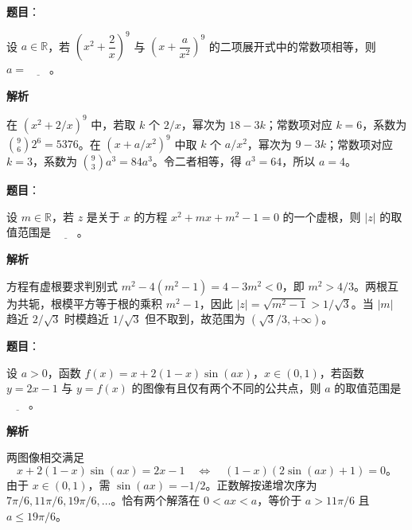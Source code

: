 \begin{answer}

\textbf{题目}：

设 $a\in\mathbb R$，若 $\left(x^2+\dfrac{2}{x}\right)^9$ 与 $\left(x+\dfrac{a}{x^2}\right)^9$ 的二项展开式中的常数项相等，则 $a=\underline{\qquad}$。

\textbf{解析}

在 $(x^2+2/x)^9$ 中，若取 $k$ 个 $2/x$，幂次为 $18-3k$；常数项对应 $k=6$，系数为 $\binom96 2^6=5376$。在 $(x+a/x^2)^9$ 中取 $k$ 个 $a/x^2$，幂次为 $9-3k$；常数项对应 $k=3$，系数为 $\binom93a^3=84a^3$。令二者相等，得 $a^3=64$，所以 $a=4$。


\end{answer}
\begin{answer}

\textbf{题目}：

设 $m\in\mathbb R$，若 $z$ 是关于 $x$ 的方程 $x^2+mx+m^2-1=0$ 的一个虚根，则 $|z|$ 的取值范围是 $\underline{\qquad}$。

\textbf{解析}

方程有虚根要求判别式 $m^2-4(m^2-1)=4-3m^2<0$，即 $m^2>4/3$。两根互为共轭，根模平方等于根的乘积 $m^2-1$，因此 $|z|=\sqrt{m^2-1}>1/\sqrt3$。当 $|m|$ 趋近 $2/\sqrt3$ 时模趋近 $1/\sqrt3$ 但不取到，故范围为 $(\sqrt3/3,+\infty)$。


\end{answer}
\begin{answer}

\textbf{题目}：

设 $a>0$，函数 $f(x)=x+2(1-x)\sin(ax)$，$x\in(0,1)$，若函数 $y=2x-1$ 与 $y=f(x)$ 的图像有且仅有两个不同的公共点，则 $a$ 的取值范围是 $\underline{\qquad}$。

\textbf{解析}

两图像相交满足
\nopagebreak[4]
\[
x+2(1-x)\sin(ax)=2x-1
\quad\Longleftrightarrow\quad
(1-x)(2\sin(ax)+1)=0\text{。}
\]
由于 $x\in(0,1)$，需 $\sin(ax)=-1/2$。正数解按递增次序为 $7\pi/6,11\pi/6,19\pi/6,\ldots$。恰有两个解落在 $0<ax<a$，等价于 $a>11\pi/6$ 且 $a\leq19\pi/6$。

\gkanswer{答案：$(\dfrac{11\pi}{6},\dfrac{19\pi}{6}]$}

\end{answer}
